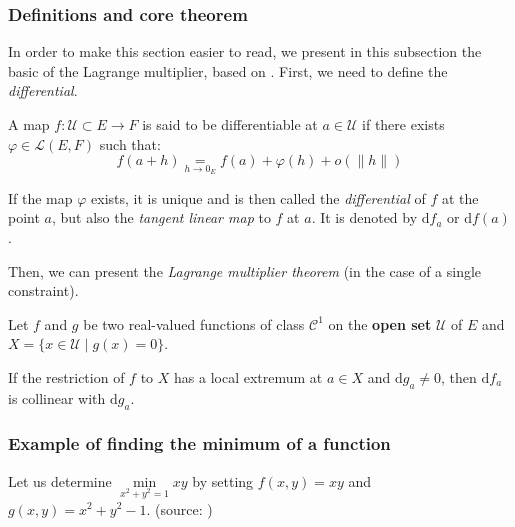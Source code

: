 \documentclass[12pt, openany]{article}
\begin{document}
\subsubsection{Definitions and core theorem}

In order to make this section easier to read, we present in this subsection the basic of the Lagrange multiplier, based on \cite{cours_prost}. First, we need to define the \emph{differential}.

\begin{definition}

    A map $f : \mathscr{U} \subset E \to F$ is said to be differentiable at $a \in \mathscr{U}$ if there exists $\varphi \in \mathscr{L}(E, F)$ such that:
    $$f(a+h) \underset{h \to 0_E}{=} f(a) + \varphi(h) + o(\|h\|)$$
    
    If the map $\varphi$ exists, it is unique and is then called the \textit{differential} of $f$ at the point $a$, but also the \textit{tangent linear map} to $f$ at $a$. It is denoted by $\mathrm{d}f_a$ or $\mathrm{d}f(a)$.
\end{definition}

Then, we can present the \emph{Lagrange multiplier theorem} (in the case of a single constraint).

\begin{theorem}
    Let $f$ and $g$ be two real-valued functions of class $\mathscr{C}^1$ on the \textbf{open set} $\mathscr{U}$ of $E$ and $X = \{x \in \mathscr{U} \mid g(x) = 0\}$.
    
    If the restriction of $f$ to $X$ has a local extremum at $a \in X$ and $\mathrm{d}g_a \neq 0$, then $\mathrm{d}f_a$ is collinear with $\mathrm{d}g_a$.
\end{theorem}

\subsubsection{Example of finding the minimum of a function}

Let us determine $\underset{x^2+y^2=1}{\min} x y$ by setting $f(x, y) = x y$ and $g(x, y) = x^2 + y^2 - 1$. (source: \cite{cours_prost})
\end{document}
